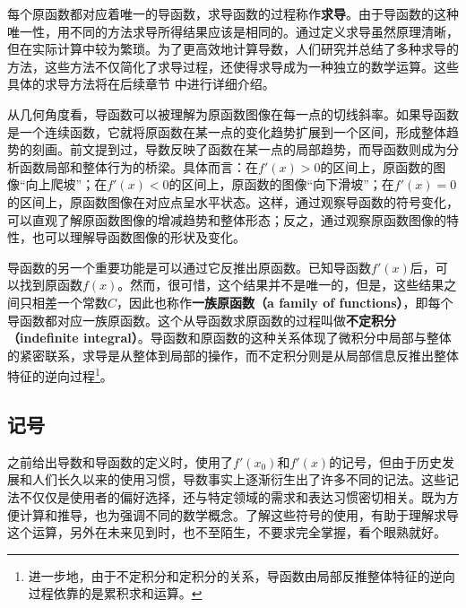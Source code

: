 每个原函数都对应着唯一的导函数，求导函数的过程称作\textbf{求导}。由于导函数的这种唯一性，用不同的方法求导所得结果应该是相同的。通过定义求导虽然原理清晰，但在实际计算中较为繁琐。为了更高效地计算导数，人们研究并总结了多种求导的方法，这些方法不仅简化了求导过程，还使得求导成为一种独立的数学运算。这些具体的求导方法将在后续章节  中进行详细介绍。

从几何角度看，导函数可以被理解为原函数图像在每一点的切线斜率。如果导函数是一个连续函数，它就将原函数在某一点的变化趋势扩展到一个区间，形成整体趋势的刻画。前文提到过，导数反映了函数在某一点的局部趋势，而导函数则成为分析函数局部和整体行为的桥梁。具体而言：在$f'(x) > 0$的区间上，原函数的图像“向上爬坡”；在$f'(x) < 0$的区间上，原函数的图像“向下滑坡”；在$f'(x) = 0$的区间上，原函数图像在对应点呈水平状态。这样，通过观察导函数的符号变化，可以直观了解原函数图像的增减趋势和整体形态；反之，通过观察原函数图像的特性，也可以理解导函数图像的形状及变化。

导函数的另一个重要功能是可以通过它反推出原函数。已知导函数$f'(x)$后，可以找到原函数$f(x)$。然而，很可惜，这个结果并不是唯一的，但是，这些结果之间只相差一个常数$C$，因此也称作\textbf{一族原函数（a family of functions）}，即每个导函数都对应一族原函数。这个从导函数求原函数的过程叫做\textbf{不定积分（indefinite integral）}。导函数和原函数的这种关系体现了微积分中局部与整体的紧密联系，求导是从整体到局部的操作，而不定积分则是从局部信息反推出整体特征的逆向过程\footnote{进一步地，由于不定积分和定积分的关系，导函数由局部反推整体特征的逆向过程依靠的是累积求和运算。}。

\subsection{记号}

之前给出导数和导函数的定义时，使用了$f'(x_0)$和$f'(x)$的记号，但由于历史发展和人们长久以来的使用习惯，导数事实上逐渐衍生出了许多不同的记法。这些记法不仅仅是使用者的偏好选择，还与特定领域的需求和表达习惯密切相关。既为方便计算和推导，也为强调不同的数学概念。了解这些符号的使用，有助于理解求导这个运算，另外在未来见到时，也不至陌生，不要求完全掌握，看个眼熟就好。

